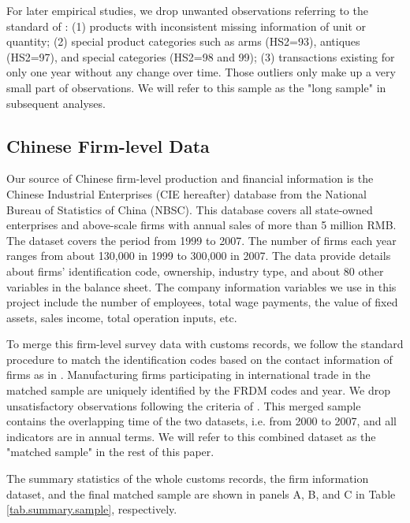 \documentclass[12pt]{article}
\begin{document}
For later empirical studies, we drop unwanted observations referring to the standard of \cite{lmx2015}: (1) products with inconsistent missing information of unit or quantity; (2) special product categories such as arms (HS2=93), antiques (HS2=97), and special categories (HS2=98 and 99); (3) transactions existing for only one year without any change over time. Those outliers only make up a very small part of observations. We will refer to this sample as the "long sample" in subsequent analyses.

\subsection{Chinese Firm-level Data} \label{Data-CIE}

Our source of Chinese firm-level production and financial information is the Chinese Industrial Enterprises (CIE hereafter) database from the National Bureau of Statistics of China (NBSC). This database covers all state-owned enterprises and above-scale firms with annual sales of more than 5 million RMB. The dataset covers the period from 1999 to 2007. The number of firms each year ranges from about 130,000 in 1999 to 300,000 in 2007. The data provide details about firms’ identification code, ownership, industry type, and about 80 other variables in the balance sheet. The company information variables we use in this project include the number of employees, total wage payments, the value of fixed assets, sales income, total operation inputs, etc.

To merge this firm-level survey data with customs records, we follow the standard procedure to match the identification codes based on the contact information of firms as in \cite{fan-li-yeaple2015}. Manufacturing firms participating in international trade in the matched sample are uniquely identified by the FRDM codes and year. We drop unsatisfactory observations following the criteria of \cite{bkl2021}. This merged sample contains the overlapping time of the two datasets, i.e. from 2000 to 2007, and all indicators are in annual terms. We will refer to this combined dataset as the "matched sample" in the rest of this paper.

The summary statistics of the whole customs records, the firm information dataset, and the final matched sample are shown in panels A, B, and C in Table \ref{tab.summary.sample}, respectively.
\end{document}
